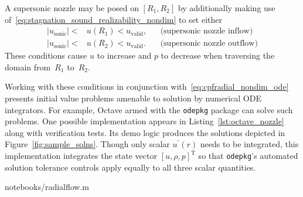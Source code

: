 \documentclass[letterpaper,11pt,nointlimits,reqno]{amsart}
\begin{document}
A supersonic nozzle may be posed on $\left[R_{1}, R_{2}\right]$ by additionally
making use of~\eqref{eq:stagnation_sound_realizability_nondim} to set either
\begin{align}
    \left|u_\text{sonic}\right| < &u\!\left(R_1\right) < u_\text{valid},
    &
    &\text{(supersonic nozzle inflow)}
\\
    \left|u_\text{sonic}\right| < &u\!\left(R_2\right) < u_\text{valid}.
    &
    &\text{(supersonic nozzle outflow)}
\end{align}
These conditions cause $u$ to increase and $p$ to decrease when traversing the
domain from~$R_{1}$ to~$R_{2}$.

Working with these conditions in conjunction
with~\eqref{eq:cpfradial_nondim_ode} presents initial value problems amenable
to solution by numerical ODE integrators.  For example,
Octave\citep{Eaton2008GNU} armed with the \texttt{odepkg} package can
solve such problems.  One possible implementation appears in
Listing~\ref{lst:octave_nozzle} along with verification tests.  Its demo logic
produces the solutions depicted in Figure~\ref{fig:sample_solns}.  Though only
scalar $u^\prime\!\left(r\right)$ needs to be integrated, this implementation
integrates the state vector $\left[u, \rho, p\right]^\mathrm{T}$ so that
\texttt{odepkg}'s automated solution tolerance controls apply equally to all
three scalar quantities.


                {notebooks/radialflow.m}
\end{document}
